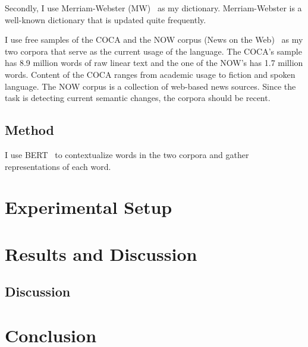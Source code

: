 \documentclass[11pt]{article}
\begin{document}
Secondly, I use Merriam-Webster (MW)~\cite{mw-2023-dictionary} as my dictionary.
Merriam-Webster is a well-known dictionary that is updated quite frequently.

I use free samples of the COCA and the NOW corpus (News on the Web)~\cite{english-corpora-2016-now} as my two corpora that serve as the current usage of the language.
The COCA's sample has 8.9 million words of raw linear text and the one of the NOW's has 1.7 million words.
Content of the COCA ranges from academic usage to fiction and spoken language.
The NOW corpus is a collection of web-based news sources.
Since the task is detecting current semantic changes, the corpora should be recent.

\subsection{Method}

I use BERT~\cite{devlin-etal-2019-bert} to contextualize words in the two corpora and gather representations of each word.

\section{Experimental Setup}

\section{Results and Discussion}

\subsection{Discussion}

\section{Conclusion}



\end{document}
